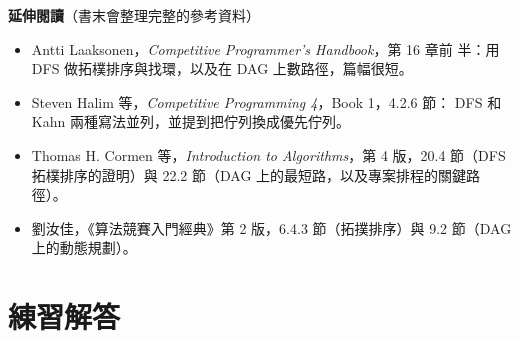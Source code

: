 \textbf{延伸閱讀}（書末會整理完整的參考資料）

\begin{itemize}
\item Antti Laaksonen，\textit{Competitive Programmer's Handbook}，第 16 章前
半：用 DFS 做拓樸排序與找環，以及在 DAG 上數路徑，篇幅很短。
\item Steven Halim 等，\textit{Competitive Programming 4}，Book 1，4.2.6 節：
DFS 和 Kahn 兩種寫法並列，並提到把佇列換成優先佇列。
\item Thomas H. Cormen 等，\textit{Introduction to Algorithms}，第 4 版，20.4
節（DFS 拓樸排序的證明）與 22.2 節（DAG 上的最短路，以及專案排程的關鍵路徑）。
\item 劉汝佳，《算法競賽入門經典》第 2 版，6.4.3 節（拓撲排序）與 9.2 節（DAG
上的動態規劃）。
\end{itemize}

\section*{練習解答}

